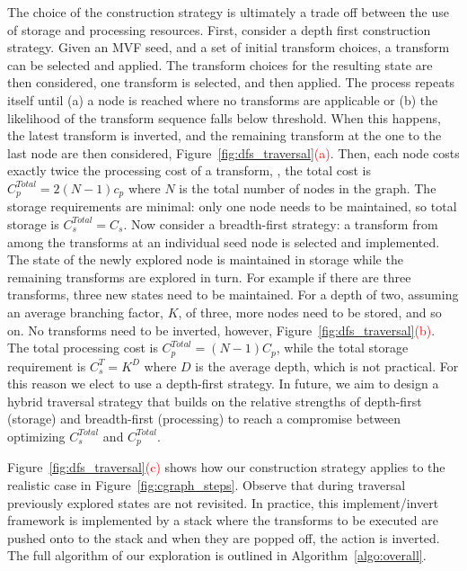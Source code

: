 The choice of the construction strategy is ultimately a trade off between the use of storage and processing resources. First, consider a depth first construction strategy. Given an MVF seed, and a set of initial transform choices, a transform can be selected and applied. The transform choices for the resulting state are then considered, one transform is selected, and then applied. The process repeats itself until (a) a node is reached where no transforms are applicable or (b) the likelihood of the transform sequence falls below threshold. When this happens, the latest transform is inverted, and the remaining transform at the one to the last node are then considered, Figure~\ref{fig:dfs_traversal}\textcolor{red}{(a)}. Then, each node costs exactly twice the processing cost of a transform, \ie, the total cost is $C^{Total}_p=2(N-1)c_p$ where $N$ is the total number of nodes in the graph. The storage requirements are minimal: only one node needs to be maintained, so total storage is $C_s^{Total}=C_s$. Now consider a breadth-first strategy: a transform from among the transforms at an individual seed node is selected and implemented. The state of the newly explored node is maintained in storage while the remaining transforms are explored in turn. For example if there are three transforms, three new states need to be maintained. For a depth of two, assuming an average branching factor, $K$, of three, more nodes need to be stored, and so on. No transforms need to be inverted, however, Figure~\ref{fig:dfs_traversal}\textcolor{red}{(b)}. The total processing cost is $C_p^{Total}=(N-1)C_p$, while the total storage requirement is $C_s^T=K^D$ where $D$ is the average depth, which is not practical. For this reason we elect to use a depth-first strategy. In future, we aim to design a hybrid traversal strategy that builds on the relative strengths of depth-first (storage) and breadth-first (processing) to reach a compromise between optimizing $C_s^{Total}$ and $C_p^{Total}$.


Figure~\ref{fig:dfs_traversal}\textcolor{red}{(c)} shows how our construction strategy applies to the realistic case in Figure~\ref{fig:cgraph_steps}. Observe that during traversal previously explored states are not revisited. In practice, this implement/invert framework is implemented by a stack where the transforms to be executed are pushed onto to the stack and when they are popped off, the action is inverted. The full algorithm of our exploration is outlined in Algorithm~\ref{algo:overall}.




